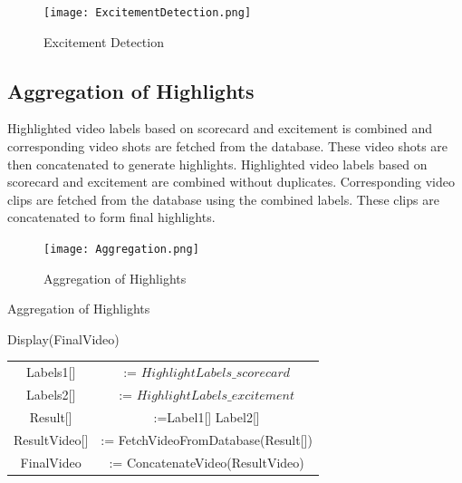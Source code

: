 \begin{figure}[h]
    \centering
    \texttt{[image: ExcitementDetection.png]}
    \caption{Excitement Detection}
    \label{fig:Excitement}
\end{figure}
\subsection{Aggregation of Highlights}

Highlighted video labels based on scorecard and excitement is combined and corresponding video shots are fetched from the database. These video shots are then concatenated to generate highlights. Highlighted video labels based on scorecard and excitement are combined without duplicates. Corresponding video clips are fetched from the database using the combined labels. These clips are concatenated to form final highlights.
\begin{figure}[h]
    \centering
    \texttt{[image: Aggregation.png]}
    \caption{Aggregation of Highlights}
    \label{fig:Aggregation of Highlights}
\end{figure}

\begin{algorithm}
\caption{Aggregation of Highlights}
\begin{algorithmic}
Display(FinalVideo)\\
\begin{table}[ht]
\begin{center}
\begin{tabular}{@{}cc@{}}
Labels1[] & := $HighlightLabels\_scorecard$\\
Labels2[] & := $HighlightLabels\_excitement$ \\
Result[] &:=Label1[] \cup  Label2[]\\
ResultVideo[] &:= FetchVideoFromDatabase(Result[])\\
FinalVideo &:= ConcatenateVideo(ResultVideo)\\
\end{tabular}
\end{center}
\end{table}
\end{algorithmic}
\end{algorithm}
